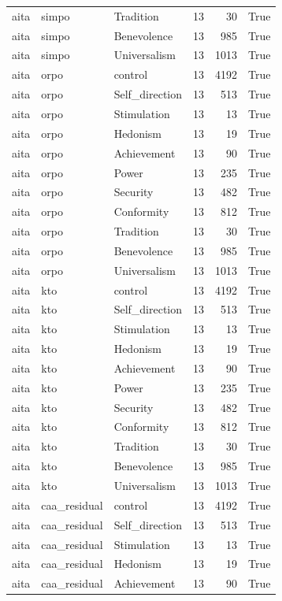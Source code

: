 \begin{tabular}{lllrrr}
aita & simpo & Tradition & 13 & 30 & True \\
aita & simpo & Benevolence & 13 & 985 & True \\
aita & simpo & Universalism & 13 & 1013 & True \\
aita & orpo & control & 13 & 4192 & True \\
aita & orpo & Self\_direction & 13 & 513 & True \\
aita & orpo & Stimulation & 13 & 13 & True \\
aita & orpo & Hedonism & 13 & 19 & True \\
aita & orpo & Achievement & 13 & 90 & True \\
aita & orpo & Power & 13 & 235 & True \\
aita & orpo & Security & 13 & 482 & True \\
aita & orpo & Conformity & 13 & 812 & True \\
aita & orpo & Tradition & 13 & 30 & True \\
aita & orpo & Benevolence & 13 & 985 & True \\
aita & orpo & Universalism & 13 & 1013 & True \\
aita & kto & control & 13 & 4192 & True \\
aita & kto & Self\_direction & 13 & 513 & True \\
aita & kto & Stimulation & 13 & 13 & True \\
aita & kto & Hedonism & 13 & 19 & True \\
aita & kto & Achievement & 13 & 90 & True \\
aita & kto & Power & 13 & 235 & True \\
aita & kto & Security & 13 & 482 & True \\
aita & kto & Conformity & 13 & 812 & True \\
aita & kto & Tradition & 13 & 30 & True \\
aita & kto & Benevolence & 13 & 985 & True \\
aita & kto & Universalism & 13 & 1013 & True \\
aita & caa\_residual & control & 13 & 4192 & True \\
aita & caa\_residual & Self\_direction & 13 & 513 & True \\
aita & caa\_residual & Stimulation & 13 & 13 & True \\
aita & caa\_residual & Hedonism & 13 & 19 & True \\
aita & caa\_residual & Achievement & 13 & 90 & True \\

\end{tabular}
